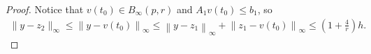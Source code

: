 \documentclass{article}
\theoremstyle{case}
\numberwithin{theorem}{subsection}
\DeclareMathOperator*{\argmin}{arg\,min}
\newcommand{\Rn}{\mathbb R^n}
\begin{document}
\begin{proof}
Notice that $v(t_0) \in B_{\infty}(p, r)$ and $A_1 v(t_0) \le b_1$,
so
\begin{align*}
\|y - z_2\|_{\infty}
\le \left\|y - v(t_0)\right\|_{\infty}
\le \left\|y - z_1\right\|_{\infty} + \left\|z_1 - v(t_0)\right\|_{\infty}
\le \left(1 + \frac 4 r\right) h.
\end{align*}









% 










% 




% 
% 
% 
% 

\end{proof}
\end{document}
